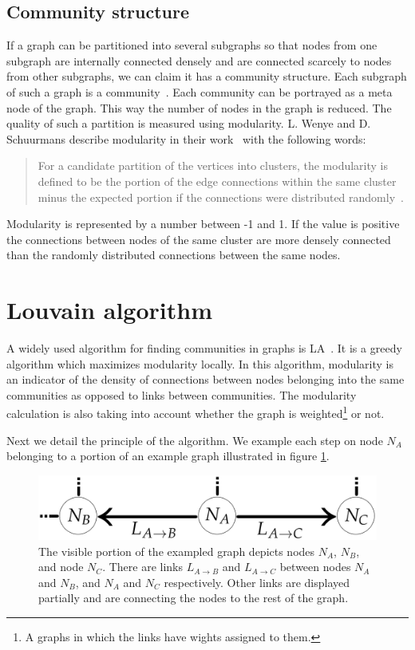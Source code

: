 \subsection{Community structure} \label{communityStructure}
If a graph can be partitioned into several subgraphs so that nodes from one subgraph are internally connected densely and are connected scarcely to nodes from other subgraphs, we can claim it has a community structure. Each subgraph of such a graph is a community~\cite{communitiesOverview}. Each community can be portrayed as a meta node of the graph. This way the number of nodes in the graph is reduced. The quality of such a partition is measured using modularity. L. Wenye and D. Schuurmans describe modularity in their work~\cite{modularityOverview} with the following words: \begin{quotation}  For a candidate partition of the vertices into clusters, the modularity is defined to be the portion of the edge connections within the same cluster minus the expected portion if the connections were distributed randomly~\cite{modularityDefinition}. \end{quotation} Modularity is represented by a number between -1 and 1. If the value is positive the connections between nodes of the same cluster are more densely connected than the randomly distributed connections between the same nodes.

\section{Louvain algorithm} \label{louvainAlgorithm}
A widely used algorithm for finding communities in graphs is LA~\cite{louvainAlgorithm}. It is a greedy algorithm which maximizes modularity locally. In this algorithm, modularity is an indicator of the density of connections between nodes belonging into the same communities as opposed to links between communities. The modularity calculation is also taking into account whether the graph is weighted\footnote{A graphs in which the links have wights assigned to them.} or not.

Next we detail the principle of the algorithm. We example each step on node $N_{A}$ belonging to a portion of an example graph illustrated in figure \ref{exampleGraphLouvain}.
\begin{figure}[ht!]
  \centering
  \includegraphics[width=\textwidth]{Images/graphForCommunity.png}
  \caption{The visible portion of the exampled graph depicts nodes $N_{A}$, $N_{B}$, and  node $N_{C}$. There are links  $L_{A\rightarrow B}$ and  $L_{A\rightarrow C}$  between nodes  $N_{A}$ and  $N_{B}$, and  $N_{A}$ and  $N_{C}$ respectively. Other links are displayed partially and are connecting the nodes to the rest of the graph.}
  \label{exampleGraphLouvain}
\end{figure} 

